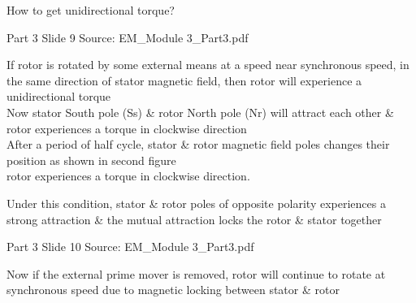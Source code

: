 \documentclass[11pt,a4paper]{article}
\begin{document}
\begin{mdframed}[roundcorner=9pt,backgroundcolor=white,linecolor=anthGreen,linewidth=1pt,innerleftmargin=12pt,innerrightmargin=12pt,innertopmargin=10pt,innerbottommargin=10pt,skipabove=8pt,skipbelow=10pt]
{\HeadingFont\fontsize{15}{18}\selectfont\color{anthDark}How to get unidirectional torque?\par}
{\color{anthMid}\small Part 3 \textbullet{} Slide 9 \textbullet{} Source: EM\_Module 3\_Part3.pdf\par}
\vspace{0.5em}
{\small
\textcolor{anthGreen}{\textbullet}\hspace{0.65em}If rotor is rotated by some external means at a speed near synchronous speed, in the same direction of stator magnetic field, then rotor will experience a unidirectional torque\\
\textcolor{anthGreen}{\textbullet}\hspace{0.65em}Now stator South pole (Ss) \& rotor North pole (Nr) will attract each other \& rotor experiences a torque in clockwise direction\\
\textcolor{anthGreen}{\textbullet}\hspace{0.65em}After a period of half cycle, stator \& rotor magnetic field poles changes their position as shown in second figure\\
\textcolor{anthGreen}{\textbullet}\hspace{0.65em}rotor experiences a torque in clockwise direction.\\

}
\end{mdframed}

\begin{mdframed}[roundcorner=9pt,backgroundcolor=white,linecolor=anthOrange,linewidth=1pt,innerleftmargin=12pt,innerrightmargin=12pt,innertopmargin=10pt,innerbottommargin=10pt,skipabove=8pt,skipbelow=10pt]
{\HeadingFont\fontsize{15}{18}\selectfont\color{anthDark}Under this condition, stator \& rotor poles of opposite polarity experiences a strong attraction \& the mutual attraction locks the rotor \& stator together\par}
{\color{anthMid}\small Part 3 \textbullet{} Slide 10 \textbullet{} Source: EM\_Module 3\_Part3.pdf\par}
\vspace{0.5em}
{\small
\textcolor{anthOrange}{\textbullet}\hspace{0.65em}Now if the external prime mover is removed, rotor will continue to rotate at synchronous speed due to magnetic locking between stator \& rotor\\

}
\end{mdframed}
\end{document}
